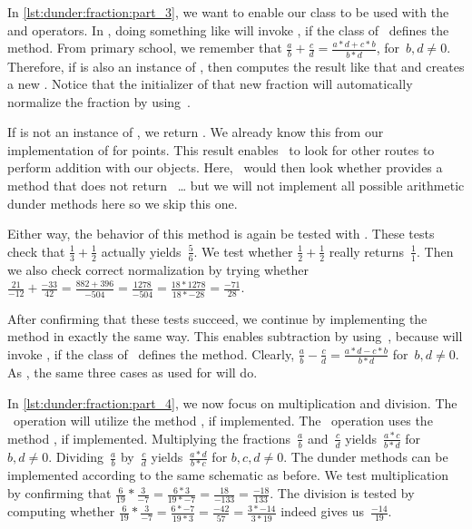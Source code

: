 In \cref{lst:dunder:fraction:part_3}, we want to enable our  class to be used with the \pythonil{+} and \pythonil{-} operators.
In \python, doing something like  will invoke , if the class of~ defines the  method.
From primary school, we remember that $\frac{a}{b}+\frac{c}{d} = \frac{a*d+c*b}{b*d}$, for~$b,d\neq0$.
Therefore, if  is also an instance of ,  then  computes the result like that and creates a new .
Notice that the initializer of that new fraction will automatically normalize the fraction by using~.

If  is not an instance of , we return .
We already know this from our implementation of  for points.
This result enables \python\ to look for other routes to perform addition with our objects.
Here, \python\ would then look whether  provides a  method that does not return~ {\dots} but we will not implement all possible arithmetic dunder methods here so we skip this one.

Either way, the behavior of this method is again be tested with .
These tests check that $\frac{1}{3} + \frac{1}{2}$ actually yields~$\frac{5}{6}$.
We test whether  $\frac{1}{2}+\frac{1}{2}$ really returns~$\frac{1}{1}$.
Then we also check correct normalization by trying whether~$\frac{21}{-12}+\frac{-33}{42}=\frac{882+396}{-504}=\frac{1278}{-504}=\frac{18*1278}{18*-28}=\frac{-71}{28}$.

After confirming that these tests succeed, we continue by implementing the  method in exactly the same way.
This enables subtraction by using~\pythonilIdx{-}, because  will invoke , if the class of~ defines the  method.
Clearly, $\frac{a}{b}-\frac{c}{d} = \frac{a*d-c*b}{b*d}$ for~$b,d\neq0$.
As , the same three cases as used for  will do.

In \cref{lst:dunder:fraction:part_4}, we now focus on multiplication and division.
The \pythonil{*}~operation will utilize the method , if implemented.
The \pythonil{/}~operation uses the method , if implemented.
Multiplying the fractions~$\frac{a}{b}$ and~$\frac{c}{d}$ yields~$\frac{a*c}{b*d}$ for $b,d\neq0$.
Dividing~$\frac{a}{b}$ by~$\frac{c}{d}$ yields~$\frac{a*d}{b*c}$ for $b,c,d\neq0$.
The dunder methods can be implemented according to the same schematic as before.
We test multiplication by confirming that $\frac{6}{19}*\frac{3}{-7}=\frac{6 * 3}{19*-7}=\frac{18}{-133}=\frac{-18}{133}$.
The division is tested by computing whether $\frac{6}{19}*\frac{3}{-7}=\frac{6 * -7}{19*3}=\frac{-42}{57}=\frac{3*-14}{3*19}$ indeed gives us~$\frac{-14}{19}$.

